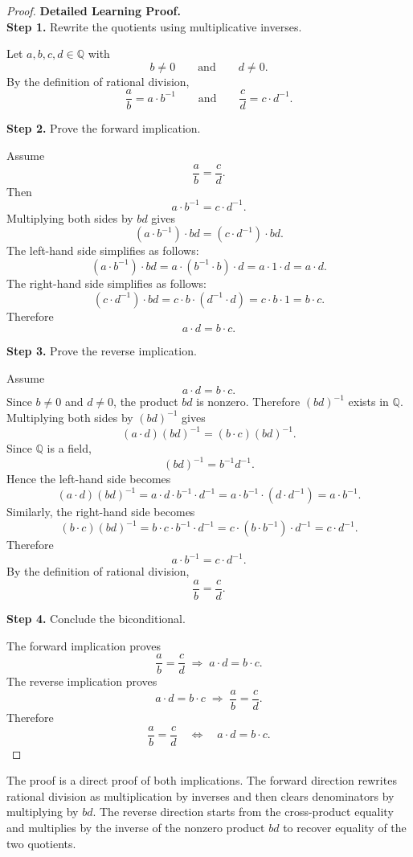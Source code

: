 \begin{proof}
\textbf{Detailed Learning Proof.}~\\

\textbf{Step 1.} Rewrite the quotients using multiplicative inverses.

Let $a,b,c,d\in\mathbb{Q}$ with
\[
b\neq 0
\qquad\text{and}\qquad
d\neq 0.
\]
By the definition of rational division,
\[
\frac{a}{b}=a\cdot b^{-1}
\qquad\text{and}\qquad
\frac{c}{d}=c\cdot d^{-1}.
\]

\textbf{Step 2.} Prove the forward implication.

Assume
\[
\frac{a}{b}=\frac{c}{d}.
\]
Then
\[
a\cdot b^{-1}=c\cdot d^{-1}.
\]
Multiplying both sides by $bd$ gives
\[
(a\cdot b^{-1})\cdot bd=(c\cdot d^{-1})\cdot bd.
\]
The left-hand side simplifies as follows:
\[
(a\cdot b^{-1})\cdot bd
=
a\cdot (b^{-1}\cdot b)\cdot d
=
a\cdot 1\cdot d
=
a\cdot d.
\]
The right-hand side simplifies as follows:
\[
(c\cdot d^{-1})\cdot bd
=
c\cdot b\cdot (d^{-1}\cdot d)
=
c\cdot b\cdot 1
=
b\cdot c.
\]
Therefore
\[
a\cdot d=b\cdot c.
\]

\textbf{Step 3.} Prove the reverse implication.

Assume
\[
a\cdot d=b\cdot c.
\]
Since $b\neq 0$ and $d\neq 0$, the product $bd$ is nonzero. Therefore
$(bd)^{-1}$ exists in $\mathbb{Q}$. Multiplying both sides by $(bd)^{-1}$
gives
\[
(a\cdot d)(bd)^{-1}=(b\cdot c)(bd)^{-1}.
\]
Since $\mathbb{Q}$ is a field,
\[
(bd)^{-1}=b^{-1}d^{-1}.
\]
Hence the left-hand side becomes
\[
(a\cdot d)(bd)^{-1}
=
a\cdot d\cdot b^{-1}\cdot d^{-1}
=
a\cdot b^{-1}\cdot (d\cdot d^{-1})
=
a\cdot b^{-1}.
\]
Similarly, the right-hand side becomes
\[
(b\cdot c)(bd)^{-1}
=
b\cdot c\cdot b^{-1}\cdot d^{-1}
=
c\cdot (b\cdot b^{-1})\cdot d^{-1}
=
c\cdot d^{-1}.
\]
Therefore
\[
a\cdot b^{-1}=c\cdot d^{-1}.
\]
By the definition of rational division,
\[
\frac{a}{b}=\frac{c}{d}.
\]

\textbf{Step 4.} Conclude the biconditional.

The forward implication proves
\[
\frac{a}{b}=\frac{c}{d}
\;\Longrightarrow\;
a\cdot d=b\cdot c.
\]
The reverse implication proves
\[
a\cdot d=b\cdot c
\;\Longrightarrow\;
\frac{a}{b}=\frac{c}{d}.
\]
Therefore
\[
\frac{a}{b}=\frac{c}{d}
\quad\Longleftrightarrow\quad
a\cdot d=b\cdot c.
\]
\end{proof}

\begin{remark*}
The proof is a direct proof of both implications. The forward direction
rewrites rational division as multiplication by inverses and then clears
denominators by multiplying by $bd$. The reverse direction starts from
the cross-product equality and multiplies by the inverse of the nonzero
product $bd$ to recover equality of the two quotients.
\end{remark*}

